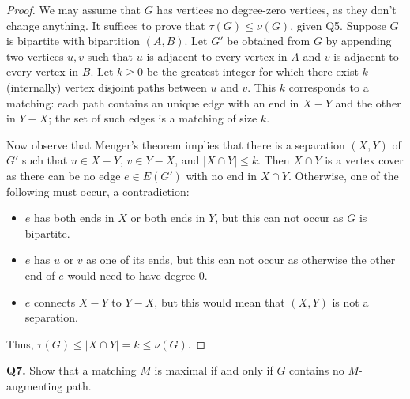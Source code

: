 \begin{proof}
We may assume that \( G \) has vertices no degree-zero vertices, as they don't change anything. It suffices to prove that \( \tau (G) \leq \nu (G) \), given Q5. Suppose \( G \) is bipartite with bipartition \( (A,B) \). Let \( G' \) be obtained from \( G \) by appending two vertices \( u,v \) such that \( u \) is adjacent to every vertex in \( A \) and \( v \) is adjacent to every vertex in \( B \). Let \( k \geq 0 \) be the greatest integer for which there exist \( k \) (internally) vertex disjoint paths between \( u \) and \( v \). This \( k \) corresponds to a matching: each path contains an unique edge with an end in \( X - Y \) and the other in \( Y - X \); the set of such edges is a matching of size \( k \).

Now observe that Menger's theorem implies that there is a separation \( (X, Y) \) of \( G' \) such that \( u \in X - Y \), \( v \in Y - X \), and \( |X \cap Y| \leq k \). Then \( X \cap Y \) is a vertex cover as there can be no edge \( e \in E(G') \) with no end in \( X \cap Y \). Otherwise, one of the following must occur, a contradiction: 
\begin{itemize}[nolistsep]
	\item \( e \) has both ends in \( X \) or both ends in \( Y \), but this can not occur as \( G \) is bipartite.
	\item \( e \) has \( u \) or \( v \) as one of its ends, but this can not occur as otherwise the other end of \( e \) would need to have degree 0.
	\item \( e \) connects \( X - Y \) to \( Y - X \), but this would mean that \( (X,Y) \) is not a separation.
\end{itemize}
Thus, \( \tau (G) \leq |X \cap Y| = k \leq \nu (G) \).
\end{proof}
\noindent \textbf{Q7.} Show that a matching \( M \) is maximal if and only if \( G \) contains no \( M \)-augmenting path.
